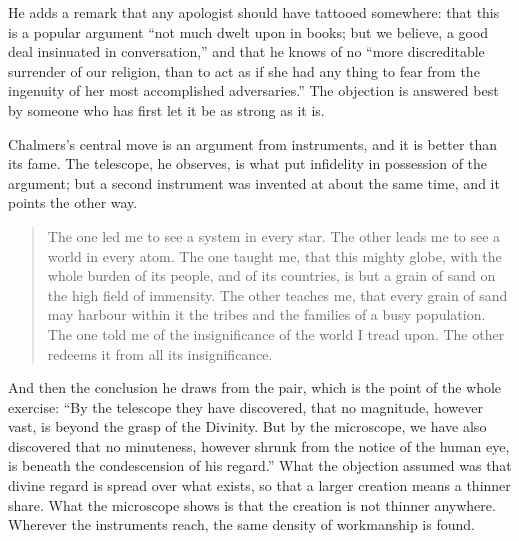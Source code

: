 He adds a remark that any apologist should have tattooed somewhere: that this is a popular argument ``not much dwelt upon in books; but we believe, a good deal insinuated in conversation,'' and that he knows of no ``more discreditable surrender of our religion, than to act as if she had any thing to fear from the ingenuity of her most accomplished adversaries.'' The objection is answered best by someone who has first let it be as strong as it is.

Chalmers's central move is an argument from instruments, and it is better than its fame. The telescope, he observes, is what put infidelity in possession of the argument; but a second instrument was invented at about the same time, and it points the other way.

\begin{quote}\small
The one led me to see a system in every star. The other leads me to see a world in every atom. The one taught me, that this mighty globe, with the whole burden of its people, and of its countries, is but a grain of sand on the high field of immensity. The other teaches me, that every grain of sand may harbour within it the tribes and the families of a busy population. The one told me of the insignificance of the world I tread upon. The other redeems it from all its insignificance.
\end{quote}

And then the conclusion he draws from the pair, which is the point of the whole exercise: ``By the telescope they have discovered, that no magnitude, however vast, is beyond the grasp of the Divinity. But by the microscope, we have also discovered that no minuteness, however shrunk from the notice of the human eye, is beneath the condescension of his regard.'' What the objection assumed was that divine regard is spread over what exists, so that a larger creation means a thinner share. What the microscope shows is that the creation is not thinner anywhere. Wherever the instruments reach, the same density of workmanship is found.

